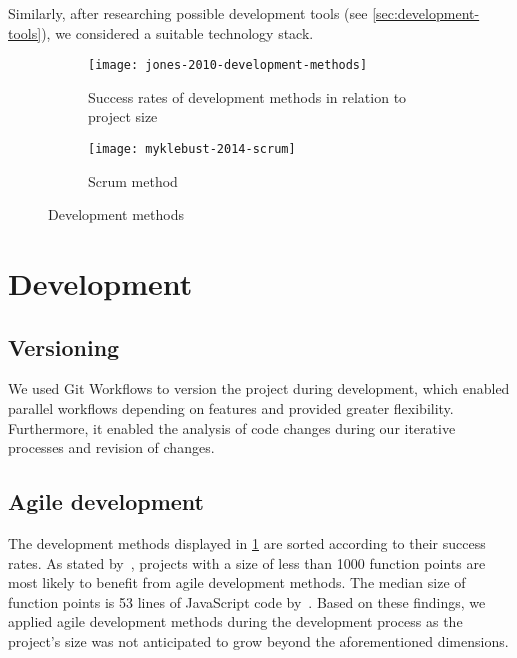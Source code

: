 Similarly, after researching possible development tools (see \cref{sec:development-tools}), we considered a suitable technology stack.

\begin{figure}[H]
    \begin{subfigure}[b]{\textwidth}
        \centering
        \texttt{[image: jones-2010-development-methods]}
        \caption[Success rates of development methods]{Success rates of development methods in relation to project size~\autocite[11]{jones_software_2010}}
        \label{fig:success-rates-development-methods}
    \end{subfigure}
    \begin{subfigure}[b]{\textwidth}
        \centering
        \texttt{[image: myklebust-2014-scrum]}
        \caption[Scrum method]{Scrum method~\autocite[2]{myklebust_scrum_nodate}}
        \label{fig:scrum-method}
    \end{subfigure}
    \caption{Development methods}\label{fig:development-methods}
\end{figure}

\section{Development}\label{sec:development}

\subsection{Versioning}\label{subsec:versioning}

We used Git Workflows to version the project during development, which enabled parallel workflows depending on features and provided greater flexibility.
Furthermore, it enabled the analysis of code changes during our iterative processes and revision of changes.

\subsection{Agile development}\label{subsec:agile-development}

The development methods displayed in \cref{fig:success-rates-development-methods} are sorted according to their success rates.
As stated by~\textcite[10-12]{jones_software_2010}, projects with a size of less than 1000 function points are most likely to benefit from agile development methods.
The median size of function points is 53 lines of JavaScript code by~\textcite{qsm_function_2009}.
Based on these findings, we applied agile development methods during the development process as the project's size was not anticipated to grow beyond the aforementioned dimensions.

